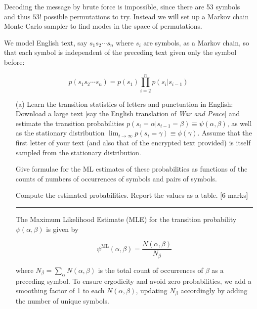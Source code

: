 \documentclass{article}
\begin{document}
\noindent Decoding the message by brute force is impossible, since there are 53 symbols and thus \( 53! \) possible permutations to try. Instead we will set up a Markov chain Monte Carlo sampler to find modes in the space of permutations.
\vspace{0.5em}

\noindent We model English text, say \( s_1 s_2 \cdots s_n \) where \( s_i \) are symbols, as a Markov chain, so that each symbol is independent of the preceding text given only the symbol before:

\[
p(s_1 s_2 \cdots s_n) = p(s_1) \prod_{i=2}^{n} p(s_i | s_{i-1})
\]

\begin{enumerate}

    \item[(a)] Learn the transition statistics of letters and punctuation in English: Download a large text [say the English translation of \textit{War and Peace}] and estimate the transition probabilities \( p(s_i = \alpha | s_{i-1} = \beta) \equiv \psi(\alpha, \beta) \), as well as the stationary distribution \( \lim_{i \to \infty} p(s_i = \gamma) \equiv \phi(\gamma) \). Assume that the first letter of your text (and also that of the encrypted text provided) is itself sampled from the stationary distribution.
    
    Give formulae for the ML estimates of these probabilities as functions of the counts of numbers of occurrences of symbols and pairs of symbols.
    
    Compute the estimated probabilities. Report the values as a table. [6 marks]
    
    \noindent\textcolor{gray}{\rule{0.1\linewidth}{0.4pt}}
    \vspace{10pt}
    
    The Maximum Likelihood Estimate (MLE) for the transition probability \( \psi(\alpha, \beta) \) is given by
    
    \begin{equation}
    \psi^{\text{ML}}(\alpha, \beta) = \frac{N(\alpha, \beta)}{N_\beta}
    \end{equation}
    
    where \( N_\beta = \sum_{\alpha} N(\alpha, \beta) \) is the total count of occurrences of \( \beta \) as a preceding symbol. To ensure ergodicity and avoid zero probabilities, we add a smoothing factor of 1 to each \( N(\alpha, \beta) \), updating \( N_\beta \) accordingly by adding the number of unique symbols.


\end{enumerate}
\end{document}
